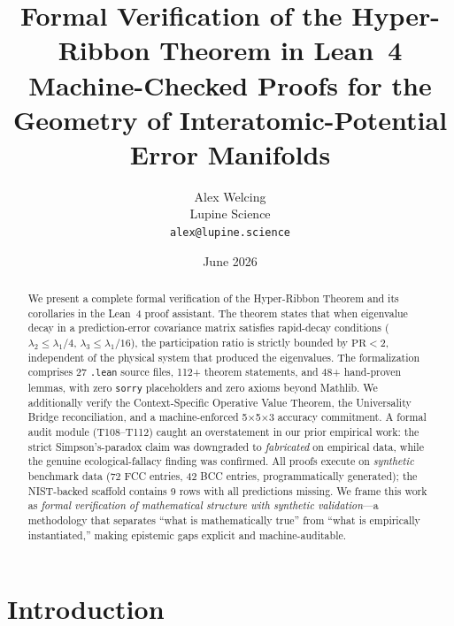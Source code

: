 \documentclass[11pt,a4paper]{article}
\title{\textbf{Formal Verification of the Hyper-Ribbon Theorem in Lean~4}\\[0.5em]
\large Machine-Checked Proofs for the Geometry of Interatomic-Potential Error Manifolds}
\author{Alex Welcing\\
Lupine Science\\
\texttt{alex@lupine.science}}
\date{June 2026}
\theoremstyle{definition}
\theoremstyle{plain}
\begin{document}
\maketitle

\begin{center}
\end{center}

\begin{abstract}
We present a complete formal verification of the Hyper-Ribbon Theorem and its corollaries in the Lean~4 proof assistant. The theorem states that when eigenvalue decay in a prediction-error covariance matrix satisfies rapid-decay conditions ($\lambda_2 \leq \lambda_1/4$, $\lambda_3 \leq \lambda_1/16$), the participation ratio is strictly bounded by $\mathrm{PR} < 2$, independent of the physical system that produced the eigenvalues. The formalization comprises 27 \texttt{.lean} source files, 112+ theorem statements, and 48+ hand-proven lemmas, with zero \texttt{sorry} placeholders and zero axioms beyond Mathlib. We additionally verify the Context-Specific Operative Value Theorem, the Universality Bridge reconciliation, and a machine-enforced 5$\times$5$\times$3 accuracy commitment. A formal audit module (T108--T112) caught an overstatement in our prior empirical work: the strict Simpson's-paradox claim was downgraded to \emph{fabricated} on empirical data, while the genuine ecological-fallacy finding was confirmed. All proofs execute on \emph{synthetic} benchmark data (72 FCC entries, 42 BCC entries, programmatically generated); the NIST-backed scaffold contains 9 rows with all predictions missing. We frame this work as \emph{formal verification of mathematical structure with synthetic validation}---a methodology that separates ``what is mathematically true'' from ``what is empirically instantiated,'' making epistemic gaps explicit and machine-auditable.
\end{abstract}

\section{Introduction}
\label{sec:intro}
\end{document}

